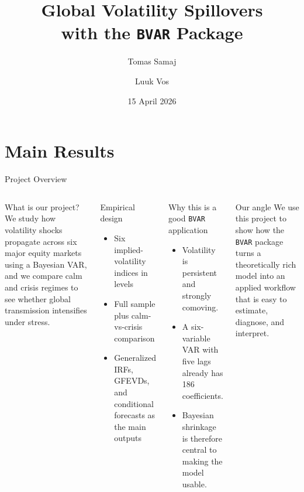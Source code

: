 \documentclass[10pt, aspectratio=169]{beamer}
\title{Global Volatility Spillovers\\with the \texttt{BVAR} Package}
\author{Tomas Samaj \and Luuk Vos}
\institute{WU Vienna}
\date{15 April 2026}
\begin{document}

\maketitle

\section{Main Results}

\begin{frame}{Project Overview}
\small
\begin{columns}[T,onlytextwidth]
  \begin{block}{What is our project?}
  We study how volatility shocks propagate across six major equity markets using a Bayesian VAR, and we compare calm and crisis regimes to see whether global transmission intensifies under stress.
  \end{block}

  \begin{block}{Empirical design}
  \begin{itemize}
    \item Six implied-volatility indices in levels
    \item Full sample plus calm-vs-crisis comparison
    \item Generalized IRFs, GFEVDs, and conditional forecasts as the main outputs
  \end{itemize}
  \end{block}

  \begin{block}{Why this is a good \texttt{BVAR} application}
  \begin{itemize}
    \item Volatility is persistent and strongly comoving.
    \item A six-variable VAR with five lags already has 186 coefficients.
    \item Bayesian shrinkage is therefore central to making the model usable.
  \end{itemize}
  \end{block}

  \begin{alertblock}{Our angle}
  We use this project to show how the \texttt{BVAR} package turns a theoretically rich model into an applied workflow that is easy to estimate, diagnose, and interpret.
  \end{alertblock}
\end{columns}
\end{frame}
\end{document}
